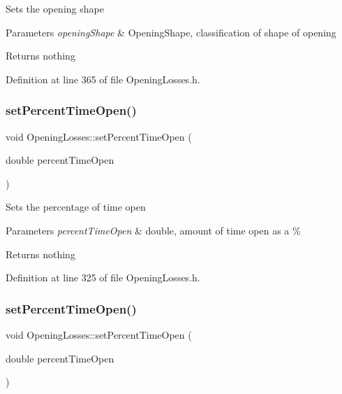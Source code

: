 Sets the opening shape


\begin{DoxyParams}{Parameters}
{\em opening\+Shape} & Opening\+Shape, classification of shape of opening\\
\hline
\end{DoxyParams}
\begin{DoxyReturn}{Returns}
nothing 
\end{DoxyReturn}


Definition at line 365 of file Opening\+Losses.\+h.

\mbox{\label{class_opening_losses_a889b6aa25bf6d8fc8fb284ec0c2a1625}} 
\subsubsection{\texorpdfstring{set\+Percent\+Time\+Open()}{setPercentTimeOpen()}\hspace{0.1cm}{\footnotesize\ttfamily [1/3]}}
{\footnotesize\ttfamily void Opening\+Losses\+::set\+Percent\+Time\+Open (\begin{DoxyParamCaption}\item[{double}]{percent\+Time\+Open }\end{DoxyParamCaption})\hspace{0.3cm}{\ttfamily [inline]}}

Sets the percentage of time open


\begin{DoxyParams}{Parameters}
{\em percent\+Time\+Open} & double, amount of time open as a \%\\
\hline
\end{DoxyParams}
\begin{DoxyReturn}{Returns}
nothing 
\end{DoxyReturn}


Definition at line 325 of file Opening\+Losses.\+h.

\mbox{\label{class_opening_losses_a889b6aa25bf6d8fc8fb284ec0c2a1625}} 
\subsubsection{\texorpdfstring{set\+Percent\+Time\+Open()}{setPercentTimeOpen()}\hspace{0.1cm}{\footnotesize\ttfamily [2/3]}}
{\footnotesize\ttfamily void Opening\+Losses\+::set\+Percent\+Time\+Open (\begin{DoxyParamCaption}\item[{double}]{percent\+Time\+Open }\end{DoxyParamCaption})\hspace{0.3cm}{\ttfamily [inline]}}

